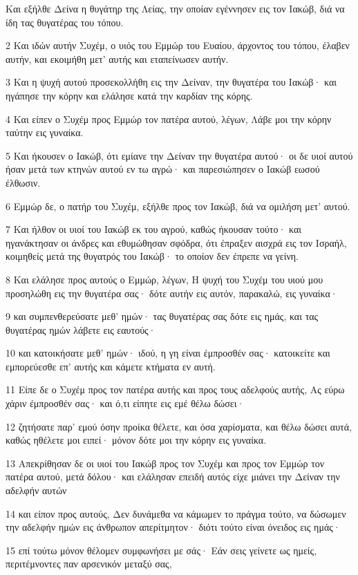 \par Και εξήλθε Δείνα η θυγάτηρ της Λείας, την οποίαν εγέννησεν εις τον Ιακώβ, διά να ίδη τας θυγατέρας του τόπου.
\par 2 Και ιδών αυτήν Συχέμ, ο υιός του Εμμώρ του Ευαίου, άρχοντος του τόπου, έλαβεν αυτήν, και εκοιμήθη μετ' αυτής και εταπείνωσεν αυτήν.
\par 3 Και η ψυχή αυτού προσεκολλήθη εις την Δείναν, την θυγατέρα του Ιακώβ· και ηγάπησε την κόρην και ελάλησε κατά την καρδίαν της κόρης.
\par 4 Και είπεν ο Συχέμ προς Εμμώρ τον πατέρα αυτού, λέγων, Λάβε μοι την κόρην ταύτην εις γυναίκα.
\par 5 Και ήκουσεν ο Ιακώβ, ότι εμίανε την Δείναν την θυγατέρα αυτού· οι δε υιοί αυτού ήσαν μετά των κτηνών αυτού εν τω αγρώ· και παρεσιώπησεν ο Ιακώβ εωσού έλθωσιν.
\par 6 Εμμώρ δε, ο πατήρ του Συχέμ, εξήλθε προς τον Ιακώβ, διά να ομιλήση μετ' αυτού.
\par 7 Και ήλθον οι υιοί του Ιακώβ εκ του αγρού, καθώς ήκουσαν τούτο· και ηγανάκτησαν οι άνδρες και εθυμώθησαν σφόδρα, ότι έπραξεν αισχρά εις τον Ισραήλ, κοιμηθείς μετά της θυγατρός του Ιακώβ· το οποίον δεν έπρεπε να γείνη.
\par 8 Και ελάλησε προς αυτούς ο Εμμώρ, λέγων, Η ψυχή του Συχέμ του υιού μου προσηλώθη εις την θυγατέρα σας· δότε αυτήν εις αυτόν, παρακαλώ, εις γυναίκα·
\par 9 και συμπενθερεύσατε μεθ' ημών· τας θυγατέρας σας δότε εις ημάς, και τας θυγατέρας ημών λάβετε εις εαυτούς·
\par 10 και κατοικήσατε μεθ' ημών· ιδού, η γη είναι έμπροσθέν σας· κατοικείτε και εμπορεύεσθε επ' αυτής και κάμετε κτήματα εν αυτή.
\par 11 Είπε δε ο Συχέμ προς τον πατέρα αυτής και προς τους αδελφούς αυτής, Ας εύρω χάριν έμπροσθέν σας· και ό,τι είπητε εις εμέ θέλω δώσει·
\par 12 ζητήσατε παρ' εμού όσην προίκα θέλετε, και όσα χαρίσματα, και θέλω δώσει αυτά, καθώς ηθέλετε μοι ειπεί· μόνον δότε μοι την κόρην εις γυναίκα.
\par 13 Απεκρίθησαν δε οι υιοί του Ιακώβ προς τον Συχέμ και προς τον Εμμώρ τον πατέρα αυτού, μετά δόλου· και ελάλησαν επειδή αυτός είχε μιάνει την Δείναν την αδελφήν αυτών
\par 14 και είπον προς αυτούς, Δεν δυνάμεθα να κάμωμεν το πράγμα τούτο, να δώσωμεν την αδελφήν ημών εις άνθρωπον απερίτμητον· διότι τούτο είναι όνειδος εις ημάς·
\par 15 επί τούτω μόνον θέλομεν συμφωνήσει με σάς· Εάν σεις γείνετε ως ημείς, περιτέμνοντες παν αρσενικόν μεταξύ σας,
